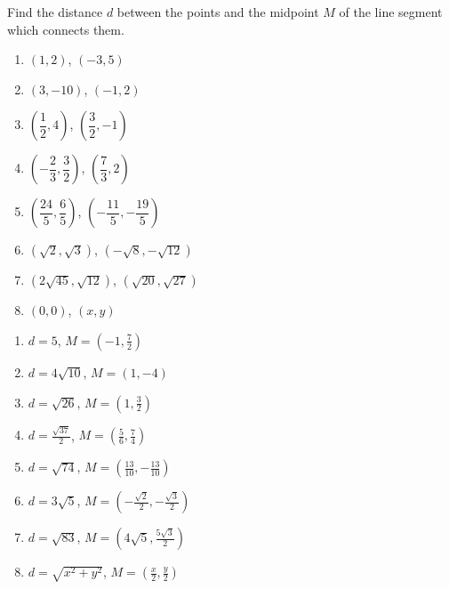 \begin{enumialphparenastyle}
\begin{multicols}{2}
\begin{ex}
Find the distance $d$ between the points and the midpoint $M$ of the line segment which connects them.\\
\begin{enumerate} 
 \item \hspace{2mm} $(1,2)$, $(-3,5)$ \\
 \item  \hspace{2mm} $(3, -10)$, $(-1, 2)$ \\ 
 \item 	\hspace{2mm} $\left( \dfrac{1}{2}, 4\right)$, $\left(\dfrac{3}{2}, -1\right)$ \\
 \item  \hspace{2mm}	 $\left(- \dfrac{2}{3}, \dfrac{3}{2} \right)$, $\left(\dfrac{7}{3}, 2\right)$ \\
 \item  \hspace{2mm} $\left( \dfrac{24}{5}, \dfrac{6}{5} \right)$, $\left( -\dfrac{11}{5}, -\dfrac{19}{5} \right)$ \\
 \item  \hspace{2mm}	 $\left(\sqrt{2}, \sqrt{3}\right)$, $\left(-\sqrt{8}, -\sqrt{12}\right)$  \\
 \item  \hspace{2mm} $\left(2 \sqrt{45}, \sqrt{12} \right)$, $\left(\sqrt{20}, \sqrt{27} \right)$\\
 \item  \hspace{2mm} $(0, 0)$, $(x, y)$ \\
\end{enumerate}
\begin{sol}
	\begin{enumerate} 
\item $d = 5$, $M = \left(-1, \frac{7}{2} \right)$
\item $d = 4 \sqrt{10}$, $M = \left(1, -4 \right)$
\item $d = \sqrt{26}$, $M = \left(1, \frac{3}{2} \right)$
\item $d= \frac{\sqrt{37}}{2}$, $M = \left(\frac{5}{6}, \frac{7}{4} \right)$
\item  $d = \sqrt{74}$, $M = \left(\frac{13}{10}, -\frac{13}{10} \right)$ 
\item $d= 3\sqrt{5}$, $M = \left(-\frac{\sqrt{2}}{2}, -\frac{\sqrt{3}}{2} \right)$
\item  $d = \sqrt{83}$, $M = \left(4 \sqrt{5}, \frac{5 \sqrt{3}}{2} \right)$
\item $d = \sqrt{x^2 + y^2}$, $M = \left( \frac{x}{2}, \frac{y}{2}\right)$ 
\end{enumerate}
\end{sol}	
\end{ex}


\end{multicols}
\end{enumialphparenastyle}
